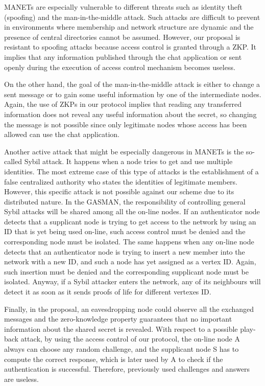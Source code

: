 \documentclass{article}
\begin{document}
MANETs are especially vulnerable to different threats such as
identity theft (spoofing) and the man-in-the-middle attack. Such
attacks are difficult to prevent in environments where membership
and network structure are dynamic and the presence of central
directories cannot be assumed. However, our proposal is resistant
to spoofing attacks because access control is granted through a ZKP. It implies
that any information published through the chat application or sent openly during the execution of access control mechanism becomes useless.

On the other hand, the goal of the man-in-the-middle
attack is  either to change a sent message or to gain some useful
information by one of the intermediate nodes. Again, the use of
ZKPs in our protocol implies that reading any transferred
information does not reveal any useful information about the
secret, so changing the message is not possible since only
legitimate nodes whose access has been allowed can use the chat
application.

Another active attack that might be especially dangerous in MANETs
is the so-called Sybil attack. It happens when a node tries to get
and use multiple identities. The most extreme case of this type of
attacks is the establishment of a false centralized authority who
states the identities of legitimate members. However, this
specific attack is not possible against our scheme due to its
distributed nature. In the GASMAN, the responsibility of
controlling general Sybil attacks will be shared among all the
on-line nodes. If an authenticator  node detects that a supplicant
node is trying to get access to the network by using an
 ID that is yet being used on-line, such access control must be denied and the corresponding node must be isolated. The same happens when any on-line node detects that
an authenticator node is trying to insert a new member into the
network with a new ID, and such a node has yet assigned as a vertex
ID. Again, such insertion must be denied and the corresponding
supplicant node must be isolated. Anyway, if a Sybil attacker
enters the network, any of its neighbours will detect it as soon
as it sends proofs of life for different vertexes ID.

Finally, in the proposal, an eavesdropping node could observe all the exchanged messages and the zero-knowledge property guarantees that no important information about the shared secret is revealed.  With respect to a possible play-back attack, by using the access control of our protocol, the on-line node A always can choose any random challenge, and the supplicant node S has to compute the correct response, which is later used by A to check if the authentication is successful. Therefore, previously used challenges and answers are useless.
\end{document}
